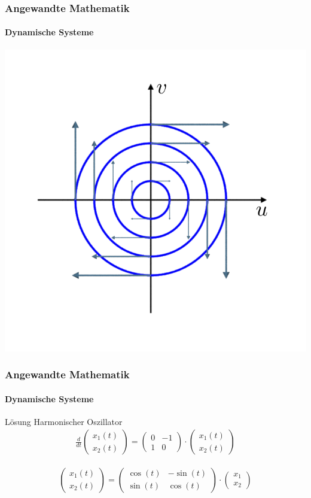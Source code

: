 \documentclass{beamer}
\begin{document}
 \begin{frame}
    \frametitle{Angewandte Mathematik}
\framesubtitle{Dynamische Systeme }
\center
\includegraphics[scale=0.35]{images/harmonicoszillatorphasespace}
 \end{frame}


 \begin{frame}
    \frametitle{Angewandte Mathematik}
\framesubtitle{Dynamische Systeme }

\begin{block}{Lösung Harmonischer Oszillator}
  \begin{align*}
    \frac{d}{dt}\begin{pmatrix}
        x_1(t) \\ x_2(t)
    \end{pmatrix} = 
\begin{pmatrix}
    0 & -1  \\ 1 & 0
\end{pmatrix} \cdot
\begin{pmatrix} 
    x_1(t) \\ x_2(t)
\end{pmatrix} 
\end{align*}

    \begin{align*}
        \begin{pmatrix}
            x_1(t) \\ x_2(t)
        \end{pmatrix} = \begin{pmatrix}
            \cos(t) & -\sin(t)  \\ \sin(t) & \cos(t)
        \end{pmatrix}   \cdot \begin{pmatrix}
            x_1\\ x_2
        \end{pmatrix}
    \end{align*}
\end{block}
 \end{frame}
\end{document}

